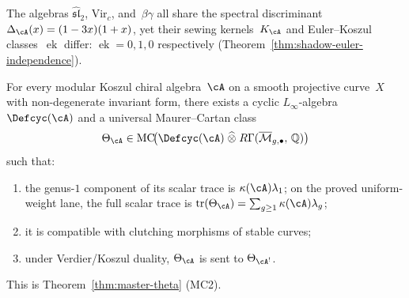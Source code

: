 \begin{remark}\label{rem:shared-discriminant-sheet}
The algebras $\widehat{\mathfrak{sl}}_2$, $\mathrm{Vir}_c$, and~$\beta\gamma$ all share the spectral discriminant $\Delta_\cA(x) = (1-3x)(1+x)$, yet their sewing kernels~$K_\cA$ and Euler--Koszul classes~$\operatorname{ek}$ differ: $\operatorname{ek} = 0, 1, 0$ respectively (Theorem~\ref{thm:shadow-euler-independence}).
\end{remark}

\begin{theorem}
\label{thm:universal-theta}
For every modular Koszul chiral algebra~$\cA$ on a smooth
projective curve~$X$ with non-degenerate invariant form,
there exists a cyclic $L_\infty$-algebra $\Defcyc(\cA)$ and a
universal Maurer--Cartan class
\[
\Theta_{\cA} \in
\operatorname{MC}\!\bigl(
  \Defcyc(\cA) \;\widehat{\otimes}\;
  R\Gamma(\overline{\mathcal{M}}_{g,\bullet},\, \mathbb{Q})
\bigr)
\]
such that:
\begin{enumerate}[label=\textup{(\roman*)}]
\item the genus-$1$ component of its scalar trace is
  $\kappa(\cA)\lambda_1$; on the proved uniform-weight lane,
  the full scalar trace is
  $\operatorname{tr}(\Theta_{\cA})
  = \sum_{g \geq 1} \kappa(\cA) \lambda_g$;
\item it is compatible with clutching morphisms of stable curves;
\item under Verdier/Koszul duality, $\Theta_{\cA}$ is sent to
  $\Theta_{\cA^!}$.
\end{enumerate}
This is Theorem~\ref{thm:master-theta} (MC2).
\end{theorem}

